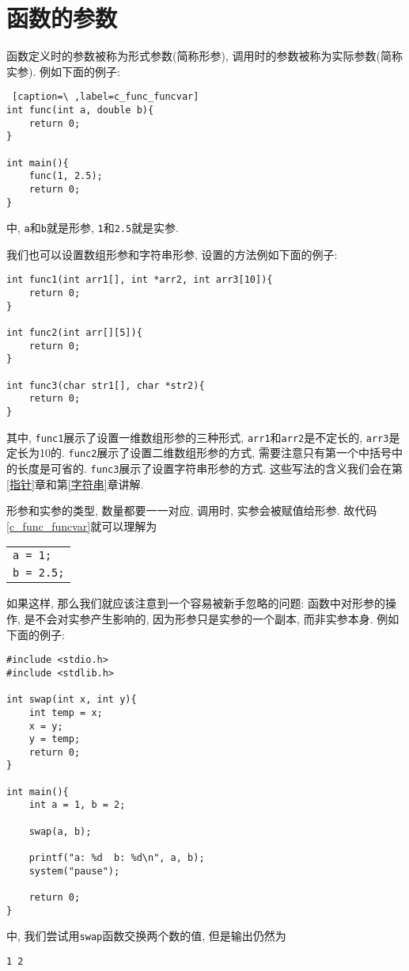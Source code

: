     \section{函数的参数}
        函数定义时的参数被称为形式参数(简称形参), 调用时的参数被称为实际参数(简称实参). 例如下面的例子:
\begin{lstlisting} [caption=\ ,label=c_func_funcvar]
int func(int a, double b){
    return 0;
}

int main(){
    func(1, 2.5);
    return 0;
}
\end{lstlisting}
        中, \texttt{a}和\texttt{b}就是形参, \texttt{1}和\texttt{2.5}就是实参.

        我们也可以设置数组形参和字符串形参, 设置的方法例如下面的例子:
\begin{lstlisting}
int func1(int arr1[], int *arr2, int arr3[10]){
    return 0;
}

int func2(int arr[][5]){
    return 0;
}

int func3(char str1[], char *str2){
    return 0;
}
\end{lstlisting}

        其中, \texttt{func1}展示了设置一维数组形参的三种形式, \texttt{arr1}和\texttt{arr2}是不定长的, \texttt{arr3}是定长为10的. \texttt{func2}展示了设置二维数组形参的方式, 需要注意只有第一个中括号中的长度是可省的. \texttt{func3}展示了设置字符串形参的方式. 这些写法的含义我们会在第\ref{指针}章和第\ref{字符串}章讲解.

        形参和实参的类型, 数量都要一一对应, 调用时, 实参会被赋值给形参. 故代码\ref{c_func_funcvar}就可以理解为
        \begin{center}
        \begin{longtable}{l}
            \texttt{a = 1;} \\
            \texttt{b = 2.5;}
        \end{longtable}
        \end{center}

        如果这样, 那么我们就应该注意到一个容易被新手忽略的问题: 函数中对形参的操作, 是不会对实参产生影响的, 因为形参只是实参的一个副本, 而非实参本身. 例如下面的例子:
\begin{lstlisting}
#include <stdio.h>
#include <stdlib.h>

int swap(int x, int y){
    int temp = x;
    x = y;
    y = temp;
    return 0;
}

int main(){
    int a = 1, b = 2;

    swap(a, b);
    
    printf("a: %d  b: %d\n", a, b);
    system("pause");

    return 0;
}
\end{lstlisting}
        中, 我们尝试用\texttt{swap}函数交换两个数的值, 但是输出仍然为
\begin{lstlisting}
1 2
\end{lstlisting}


